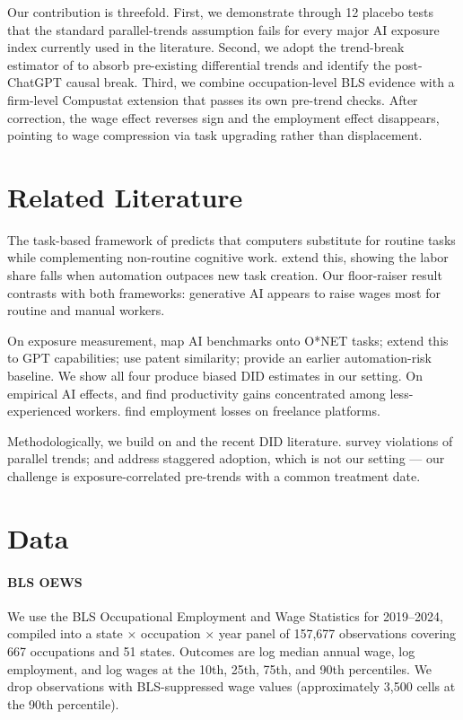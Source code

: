 \documentclass[12pt,a4paper]{article}
\begin{document}
Our contribution is threefold. First, we demonstrate through 12 placebo tests that the standard parallel-trends assumption fails for every major AI exposure index currently used in the literature. Second, we adopt the trend-break estimator of \citet{wolfers2006} to absorb pre-existing differential trends and identify the post-ChatGPT causal break. Third, we combine occupation-level BLS evidence with a firm-level Compustat extension that passes its own pre-trend checks. After correction, the wage effect reverses sign and the employment effect disappears, pointing to wage compression via task upgrading rather than displacement.

\section{Related Literature}

The task-based framework of \citet{alm2003} predicts that computers substitute for routine tasks while complementing non-routine cognitive work. \citet{acemoglu2018} extend this, showing the labor share falls when automation outpaces new task creation. Our floor-raiser result contrasts with both frameworks: generative AI appears to raise wages most for routine and manual workers.

On exposure measurement, \citet{felten2021} map AI benchmarks onto O*NET tasks; \citet{eloundou2024} extend this to GPT capabilities; \citet{webb2020} use patent similarity; \citet{fo2013} provide an earlier automation-risk baseline. We show all four produce biased DID estimates in our setting. On empirical AI effects, \citet{brynjolfsson2025} and \citet{noy2023} find productivity gains concentrated among less-experienced workers. \citet{hui2024} find employment losses on freelance platforms.

Methodologically, we build on \citet{wolfers2006} and the recent DID literature. \citet{roth2023} survey violations of parallel trends; \citet{callaway2021} and \citet{sun2021} address staggered adoption, which is not our setting — our challenge is exposure-correlated pre-trends with a common treatment date.

\section{Data}

\paragraph{BLS OEWS} We use the BLS Occupational Employment and Wage Statistics for 2019--2024, compiled into a state $\times$ occupation $\times$ year panel of 157,677 observations covering 667 occupations and 51 states. Outcomes are log median annual wage, log employment, and log wages at the 10th, 25th, 75th, and 90th percentiles. We drop observations with BLS-suppressed wage values (approximately 3,500 cells at the 90th percentile).
\end{document}

